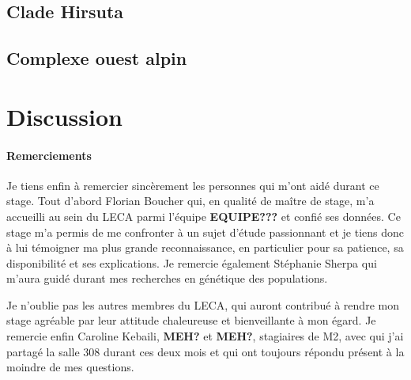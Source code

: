 \documentclass[12pt,a4paper,notitlepage]{article}
\begin{document}


\subsection{Clade Hirsuta}

\lipsum[1]

\subsection{Complexe ouest alpin}

\lipsum[1]

\section{Discussion}

\lipsum[1-4]

\paragraph{Remerciements}
Je tiens enfin à remercier sincèrement les personnes qui m'ont aidé durant ce stage.
Tout d'abord Florian Boucher qui, en qualité de maître de stage, m'a accueilli au sein du LECA parmi l'équipe \textbf{EQUIPE???} et confié ses données.
Ce stage m'a permis de me confronter à un sujet d'étude passionnant et je tiens donc à lui témoigner ma plus grande reconnaissance, en particulier pour sa patience, sa disponibilité et ses explications. Je remercie également Stéphanie Sherpa qui m'aura guidé durant mes recherches en génétique des populations.

Je n’oublie pas les autres membres du LECA, qui auront contribué à rendre mon stage agréable par leur attitude chaleureuse et bienveillante à mon égard.
Je remercie enfin Caroline Kebaili, \textbf{MEH?} et \textbf{MEH?}, stagiaires de M2, avec qui j’ai partagé la salle 308 durant ces deux mois et qui ont toujours répondu présent à la moindre de mes questions.

\newpage
\end{document}
